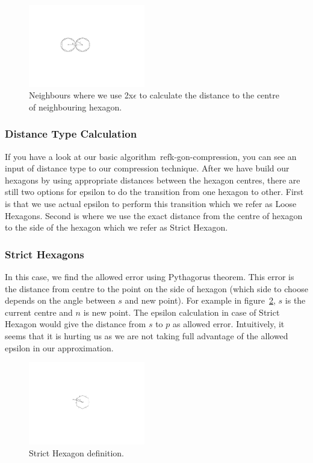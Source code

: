 \documentclass[conference]{IEEEtran}
\begin{document}
\begin{figure}[ht]
  \centering
  \includegraphics[width=2in]{images/neighbours-double-epsilon.pdf}
  \caption {Neighbours where we use 2x$\epsilon$ to calculate the distance to the centre of neighbouring hexagon.}
  \label{fig:kgon-full-epslon}
\end{figure}

\subsubsection{Distance Type Calculation}
If you have a look at our basic algorithm~ref{k-gon-compression}, you can see an input of distance type to our 
compression technique. After we have build our hexagons by using appropriate distances between the hexagon 
centres, there are still two options for epsilon to do the transition from one hexagon to other. First is that we use 
actual epsilon to perform this transition which we refer as Loose Hexagons. Second is where we use the exact 
distance from the centre of hexagon to the side of the hexagon which we refer as Strict Hexagon.

\subsubsection{Strict Hexagons}
In this case, we find the allowed error using Pythagorus theorem. This error is the distance from centre to the 
point on the side of hexagon (which side to choose depends on the angle between $s$ and new point). For 
example in figure~\ref{fig:strict-hexagon}, $s$ is the current centre and $n$ is new point. The epsilon calculation 
in case of Strict Hexagon would give the distance from $s$ to $p$ as allowed error. Intuitively, it seems that it is 
hurting us as we are not taking full advantage of the allowed epsilon in our approximation.

\begin{figure}[ht]
  \centering
  \includegraphics[width=2in]{images/strict-hexagon.pdf}
  \caption {Strict Hexagon definition.}
  \label{fig:strict-hexagon}
\end{figure}
\end{document}
